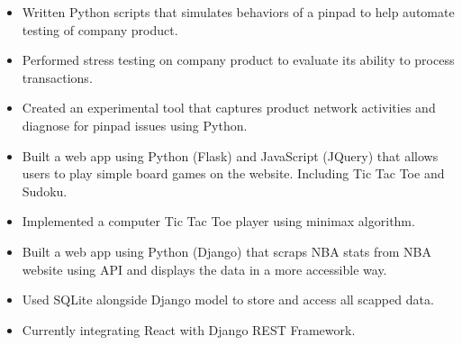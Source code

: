 

\begin{itemize}
\item Written Python scripts that simulates behaviors of a pinpad to help automate testing of company product.
\item Performed stress testing on company product to evaluate its ability to process transactions.
\item Created an experimental tool that captures product network activities and diagnose for pinpad issues using Python.
\end{itemize}

\vspace{10pt}




\vspace{5pt}

\begin{itemize}
	\item Built a web app using Python (Flask) and JavaScript (JQuery) that allows users to play simple board games on the website. Including Tic Tac Toe and Sudoku.
	\item Implemented a computer Tic Tac Toe player using minimax algorithm.
\end{itemize}

\divider


\vspace{5pt}

\begin{itemize}
	\item Built a web app using Python (Django) that scraps NBA stats from NBA website using API and displays the data in a more accessible way.
    \item Used SQLite alongside Django model to store and access all scapped data.
    \item Currently integrating React with Django REST Framework.
\end{itemize}

\divider


